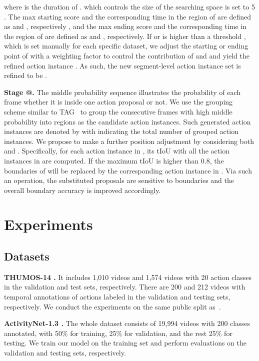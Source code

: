 \documentclass[10pt,twocolumn,letterpaper]{article}
\makeatletter
\newcommand*{\rom}[1]{\expandafter\@slowromancap\romannumeral #1@}
\makeatother
\begin{document}
where  is the duration of .  which controls the size of the searching space is set to 5 . The max starting score and the corresponding time in the region of  are defined as  and , respectively , and the max ending score and the corresponding time in the region of  are defined as  and , respectively. If  or  is higher than a threshold , which is set manually for each specific dataset, we adjust the starting or ending point of  with a weighting factor  to control the contribution of  and  and yield the refined action instance . 
As such, the new  segment-level action instance set is refined to be  .



\textbf{Stage \rom{2}.} The middle probability sequence illustrates the probability of each frame whether it is inside one action proposal or not. We use the grouping scheme similar to TAG~\cite{TAG} to group the consecutive frames with high middle probability into regions as the candidate action instances. Such generated action instances are denoted by  with  indicating the total number of grouped action instances. We propose to make a further position adjustment by considering both   and  .  Specifically, for each action instance  in , its tIoU with all the action instances in  are computed. If the maximum tIoU is higher than 0.8, the boundaries of  will be replaced by the corresponding action instance  in . Via such an operation, the substituted proposals are sensitive to boundaries and the overall boundary accuracy is improved accordingly.

\section{Experiments}

\subsection{Datasets} 

\textbf{THUMOS-14 \cite{thumos}.} It includes 1,010 videos and 1,574 videos with 20 action classes in the validation and test sets, respectively. There are 200 and 212 videos with temporal annotations of actions labeled in the validation and testing sets, respectively. We conduct the experiments on the same public split as~\cite{TAG,ctap}.


\textbf{ActivityNet-1.3 \cite{activitynet}.} The whole dataset consists of 19,994 videos
with 200 classes annotated, with 50\% for training, 25\% for validation, and the rest 25\% for testing. We train our model on the training set and perform evaluations on the
validation and testing sets, respectively.
\end{document}
